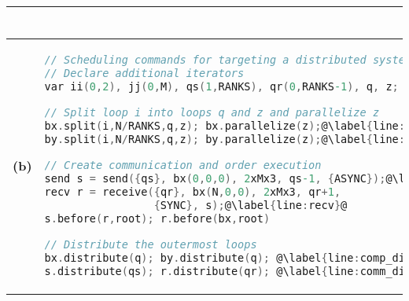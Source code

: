 \begin{figure*}[t]
\begin{tabular}{cl|@{}l}
\begin{lstlisting}[language=C,escapechar=@]
\end{lstlisting}
    

\\\hline
{\textbf{\normalsize(b)}} &
\begin{lstlisting}[language=C,escapechar=@]
// Scheduling commands for targeting a distributed system
// Declare additional iterators
var ii(0,2), jj(0,M), qs(1,RANKS), qr(0,RANKS-1), q, z;

// Split loop i into loops q and z and parallelize z
bx.split(i,N/RANKS,q,z); bx.parallelize(z);@\label{line:split1}@
by.split(i,N/RANKS,q,z); by.parallelize(z);@\label{line:split2}@ 

// Create communication and order execution
send s = send({qs}, bx(0,0,0), 2xMx3, qs-1, {ASYNC});@\label{line:send}@
recv r = receive({qr}, bx(N,0,0), 2xMx3, qr+1, 
                 {SYNC}, s);@\label{line:recv}@
s.before(r,root); r.before(bx,root)

// Distribute the outermost loops
bx.distribute(q); by.distribute(q); @\label{line:comp_dist}@
s.distribute(qs); r.distribute(qr); @\label{line:comm_dist}@
\end{lstlisting}

& 


\begin{lstlisting}[language=C,escapechar=@]

 @{\color{listingkeywordcolor}{\textbf{distributed}}}@ for (qs in 1..RANKS) @\label{line:distfor}@
   send(bx(0,0,0), 2xMx3, qs-1,{ASYNC,BLK})
 @{\color{listingkeywordcolor}{\textbf{distributed}}}@ for (qr in 0..RANKS-1)
   recv(bx(N,0,0), 2xMx3, qr+1, {SYNC,BLK})

 @{\color{listingkeywordcolor}{\textbf{distributed}}}@ for (q in 0..RANKS)
   @{\color{listingkeywordcolor}{\textbf{parallel}}}@ for (i in 0..N/RANKS)
    for (j in 0..M)
      for (c in 0..3)
        bx[i][j][c] = (in[i][j][c]+in[i][j+1][c]+in[i][j+2][c])/3@\label{fig:motivating:code2:stmt1}@
 @{\color{listingkeywordcolor}{\textbf{distributed}}}@ for (q in 0..RANKS)
   @{\color{listingkeywordcolor}{\textbf{parallel}}}@ for (i in 0..N/RANKS)
    for (j in 0..M)
      for (c in 0..3)
        by[i][j][c] = (bx[i][j][c]+bx[i+1][j][c]+bx[i+2][j][c])/3
\end{lstlisting}


\end{tabular}
\end{figure*}

